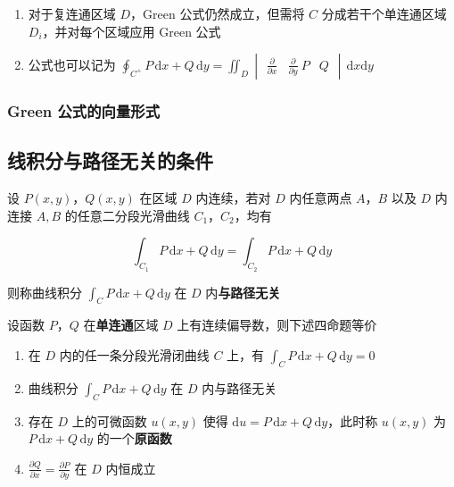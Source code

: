 \documentclass[lang = zh , final , oneside , openany , titlepage , zihao = -4 , linespread = 1.3 , baselineskip = false , cjk-font = windows , text-font = newtx , math-font = newtx , math-style = ISO , uppercase-greek = upright , integral-limits = false]{sjtureport}
\begin{document}
\begin{enumerate}
\item
  对于复连通区域 \(D\)，Green 公式仍然成立，但需将 \(C\)
  分成若干个单连通区域 \(D_i\)，并对每个区域应用 Green 公式
\item
  公式也可以记为
  \(\displaystyle\oint_{C^+} P\,\mathrm{d}x + Q\,\mathrm{d}y = \iint_D \begin{vmatrix}\frac{\partial}{\partial x}&\frac{\partial}{\partial y}\ P&Q\end{vmatrix}\,\mathrm{d}x\mathrm{d}y\)
\end{enumerate}

\subsubsection{Green 公式的向量形式}

\subsection{线积分与路径无关的条件}

\begin{definition}
    设 \(P(x,y)\)，\(Q(x,y)\) 在区域 \(D\) 内连续，若对 \(D\) 内任意两点
\(A\)，\(B\) 以及 \(D\) 内连接 \(A,B\) 的任意二分段光滑曲线
\(C_1\)，\(C_2\)，均有

\[\int_{C_1} P\,\mathrm{d}x +Q\,\mathrm{d}y = \int_{C_2} P\,\mathrm{d}x +Q\,\mathrm{d}y\]

则称曲线积分 \(\displaystyle\int_C P\,\mathrm{d}x +Q\,\mathrm{d}y\) 在
\(D\) 内\textbf{与路径无关}
\end{definition}

\begin{theorem}
    设函数 \(P\)，\(Q\) 在\textbf{单连通}区域 \(D\)
上有连续偏导数，则下述四命题等价

\begin{enumerate}
\def\labelenumi{\arabic{enumi}.}
\item
  在 \(D\) 内的任一条分段光滑闭曲线 \(C\) 上，有
  \(\displaystyle \int_C P\,\mathrm{d}x +Q\,\mathrm{d}y = 0\)
\item
  曲线积分 \(\displaystyle \int_C P\,\mathrm{d}x +Q\,\mathrm{d}y\) 在
  \(D\) 内与路径无关
\item
  存在 \(D\) 上的可微函数 \(u(x,y)\) 使得
  \(\displaystyle \mathrm{d}u = P\,\mathrm{d}x +Q\,\mathrm{d}y\)，此时称
  \(u(x,y)\) 为 \(\displaystyle P\,\mathrm{d}x +Q\,\mathrm{d}y\)
  的一个\textbf{原函数}
\item
  \(\displaystyle \frac{\partial Q}{\partial x} = \frac{\partial P}{\partial y}\)
  在 \(D\) 内恒成立
\end{enumerate}
\end{theorem}
\end{document}
